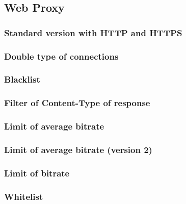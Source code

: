 \subsection{Web Proxy}
\subsubsection{Standard version with HTTP and HTTPS}

\clearpage
\subsubsection{Double type of connections}

\clearpage
\subsubsection{Blacklist}

\clearpage
\subsubsection{Filter of Content-Type of response}

\clearpage
\subsubsection{Limit of average bitrate}

\clearpage
\subsubsection{Limit of average bitrate (version 2)}

\clearpage
\subsubsection{Limit of bitrate}

\clearpage
\subsubsection{Whitelist}

\clearpage
